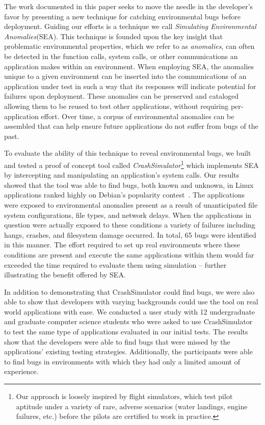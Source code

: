 The work documented in this paper
seeks to move the needle in the developer's favor
by presenting a new technique for catching environmental bugs
before deployment.
Guiding our efforts
is a technique
we call \textit{Simulating Environmental Anomalies}(SEA).
This technique is founded upon the key insight
that problematic environmental properties,
which we refer to as \textit{anomalies},
can often be detected
in the function calls,
system calls,
or other communications an application makes within an environment.
When employing SEA,
the anomalies
unique to a given environment
can be inserted into
the communications of an application under test
in such a way
that its responses will indicate potential
for failures upon deployment.
These anomalies can be preserved and cataloged
allowing them to be reused to test other applications,
without requiring
per-application effort.
Over time,
a corpus of environmental anomalies can be assembled
that can help ensure
future applications do not suffer from bugs of the past.

To evaluate the ability of this technique to reveal environmental
bugs, we built and tested a proof of concept tool
called {\em CrashSimulator}\footnote{Our approach is
loosely inspired by flight simulators, which test pilot aptitude under a
variety of rare, adverse scenarios (water landings, engine failures, etc.)
before the pilots are certified to work in practice.}
which implements SEA
by intercepting and manipulating an application's system calls.
Our results showed that the tool was able to find bugs,
both known and unknown,
in Linux applications ranked highly on Debian's popularity
contest~\cite{DebPopCon}.
The applications were exposed
to environmental anomalies present as a result of unanticipated
file system configurations, file types, and network delays.
When the applications in
question were actually exposed to these conditions a variety of failures
including hangs, crashes, and filesystem damage occurred.  In total,
65 bugs were identified in this manner.
The effort required to set up real
environments where these conditions are present
and execute the same applications within them
would far exceeded the time required to evaluate them
using simulation -- further illustrating the benefit offered by SEA.

In addition to demonstrating that
CrashSimulator could find bugs, we were also able to
show that developers with varying backgrounds
could use the tool
on real world applications with ease.
We conducted a user study with
12 undergraduate and graduate computer science students
who were asked to use CrashSimulator to test
the same type of applications evaluated in our initial tests.
The results show that the developers were able to find bugs
that were missed by the applications' existing testing strategies.
Additionally, the
participants were able to find bugs
in environments with which they had only a limited amount of experience.

